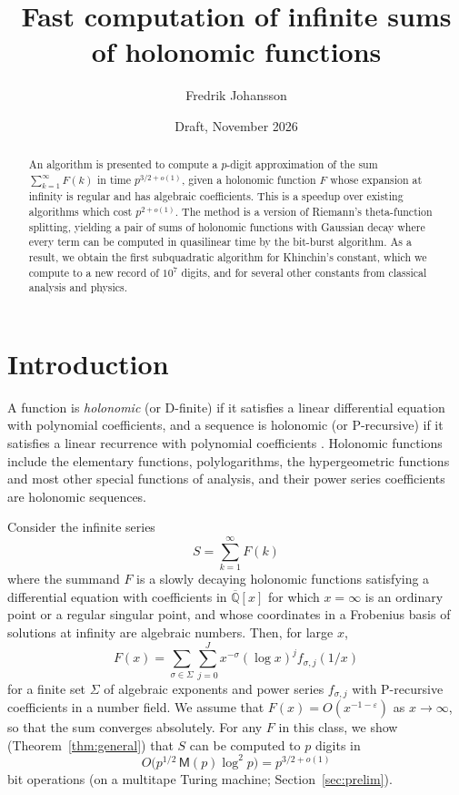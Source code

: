 \documentclass[11pt,reqno]{amsart}
\title[Computation of infinite sums of holonomic functions]{Fast computation of infinite sums of holonomic functions}
\author{Fredrik Johansson}
\date{Draft, November 2026}
\theoremstyle{definition}
\theoremstyle{remark}
\newcommand{\Qbar}{\overline{\mathbb{Q}}}
\newcommand{\Mul}{\mathsf{M}}
\begin{document}
\begin{abstract}
An algorithm is presented to
compute a $p$-digit approximation of the sum $\sum_{k=1}^{\infty} F(k)$
in time $p^{3/2+o(1)}$,
given a holonomic function $F$
whose expansion at infinity is regular and has algebraic coefficients.
This is a speedup over existing algorithms which cost $p^{2+o(1)}$.
The method is a version of Riemann's theta-function splitting,
yielding a pair of sums of holonomic functions with Gaussian decay
where every term can be computed in quasilinear time by the bit-burst algorithm.
As a result, we obtain the first
subquadratic algorithm for Khinchin's constant, which we compute to a new record of $10^7$ digits,
and for several other constants from classical analysis and physics.
\end{abstract}

\maketitle



\section{Introduction}\label{sec:intro}

A function is \emph{holonomic} (or D-finite) if it satisfies a linear differential equation with polynomial
coefficients, and a sequence is holonomic (or P-recursive) if it satisfies a linear recurrence with polynomial
coefficients \cite{Sta80}. Holonomic functions include the elementary functions, polylogarithms, the
hypergeometric functions and most other special functions of analysis, and their power series coefficients are
holonomic sequences.

Consider the infinite series
\begin{equation}\label{eq:Fsum}
  S = \sum_{k=1}^{\infty} F(k)
\end{equation}
where the summand $F$ is a slowly decaying
holonomic functions satisfying a differential equation with coefficients in $\Qbar[x]$ for which
$x = \infty$ is an ordinary point or a regular singular point, and whose
coordinates in a Frobenius basis of solutions at infinity are algebraic numbers.
Then, for large $x$,
\begin{equation}\label{eq:frob}
  F(x) = \sum_{\sigma \in \Sigma}\sum_{j=0}^{J} x^{-\sigma}(\log x)^j f_{\sigma,j}(1/x)
\end{equation}
for a finite set $\Sigma$ of algebraic exponents and power series $f_{\sigma,j}$ with P-recursive coefficients in a number
field. We assume that $F(x) = O(x^{-1-\varepsilon})$ as $x \to \infty$, so that
the sum converges absolutely. %
For any $F$ in this class, we show (Theorem~\ref{thm:general}) that $S$ can be computed to $p$ digits in
\[
  O\bigl(p^{1/2}\, \Mul(p) \log^2 p\bigr) = p^{3/2+o(1)}
\]
bit operations (on a multitape Turing machine; Section~\ref{sec:prelim}).
\end{document}

